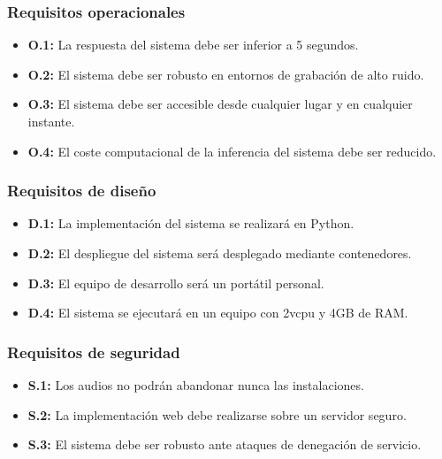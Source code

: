 \subsubsection{Requisitos operacionales}\label{sec:requisitos-operacionales}
\begin{itemize}\itemsep1pt \parskip0pt 
    \item \textbf{O.1:} La respuesta del sistema debe ser inferior a 5 segundos.
    \item \textbf{O.2:} El sistema debe ser robusto en entornos de grabación de alto ruido.
    \item \textbf{O.3:} El sistema debe ser accesible desde cualquier lugar y en cualquier instante.
    \item \textbf{O.4:} El coste computacional de la inferencia del sistema debe ser reducido.
\end{itemize}

\subsubsection{Requisitos de diseño}\label{sec:requisitos-diseno}
\begin{itemize}\itemsep1pt \parskip0pt 
    \item \textbf{D.1:} La implementación del sistema se realizará en Python.
    \item \textbf{D.2:} El despliegue del sistema será desplegado mediante contenedores.
    \item \textbf{D.3:} El equipo de desarrollo será un portátil personal.
    \item \textbf{D.4:} El sistema se ejecutará en un equipo con 2vcpu y 4GB de RAM.
\end{itemize}

\subsubsection{Requisitos de seguridad}\label{sec:requisitos-seguridad}
\begin{itemize}\itemsep1pt \parskip0pt 
    \item \textbf{S.1:} Los audios no podrán abandonar nunca las instalaciones.
    \item \textbf{S.2:} La implementación web debe realizarse sobre un servidor seguro.
    \item \textbf{S.3:} El sistema debe ser robusto ante ataques de denegación de servicio.
\end{itemize}

